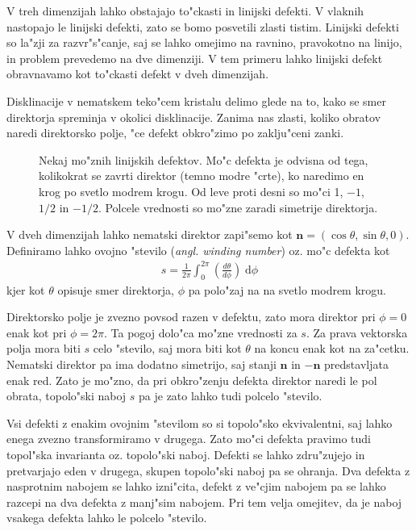 \documentclass[a4paper,10pt]{article}
\renewcommand{\vec}{\mathbf}
\newcommand{\angl}[1]{(\textit{angl. #1})}
\newcommand{\dd}{\ensuremath{\;\mathrm{d}}}
\begin{document}
V treh dimenzijah lahko obstajajo to"ckasti in linijski defekti\cite{degennes,kleman}. 
V vlaknih nastopajo le linijski defekti, zato se bomo posvetili zlasti tistim. 
Linijski defekti so la"zji za razvr"s"canje, saj se lahko omejimo na ravnino, pravokotno na linijo, in problem prevedemo na dve dimenziji. 
V tem primeru lahko linijski defekt obravnavamo kot to"ckasti defekt v dveh dimenzijah. 

Disklinacije v nematskem teko"cem kristalu delimo glede na to, kako se smer direktorja spreminja v okolici disklinacije. 
Zanima nas zlasti, koliko obratov naredi direktorsko polje, "ce defekt obkro"zimo po zaklju"ceni zanki. 

\begin{figure}[h]
 \centering
 \caption{Nekaj mo"znih linijskih defektov. Mo"c defekta je odvisna od tega, kolikokrat se zavrti direktor (temno modre "crte), ko naredimo en krog po svetlo modrem krogu. Od leve proti desni so mo"ci 1, $-1$, $1/2$ in $-1/2$. Polcele vrednosti so mo"zne zaradi simetrije direktorja. }
\end{figure}

V dveh dimenzijah lahko nematski direktor zapi"semo kot $\vec n = (\cos\theta, \sin\theta, 0)$. 
Definiramo lahko ovojno "stevilo \angl{winding number} oz. mo"c defekta kot
\begin{align}
\label{eq:winding-number}
 s = \frac{1}{2\pi}\int_0^{2\pi} \left(\frac{d\theta}{d\phi}\right) \dd \phi
\end{align}
kjer kot $\theta$ opisuje smer direktorja, $\phi$ pa polo"zaj na na svetlo modrem krogu. 

Direktorsko polje je zvezno povsod razen v defektu, zato mora direktor pri $\phi = 0$ enak kot pri $\phi = 2\pi$. 
Ta pogoj dolo"ca mo"zne vrednosti za $s$. 
Za prava vektorska polja mora biti $s$ celo "stevilo, saj mora biti kot $\theta$ na koncu enak kot na za"cetku. 
Nematski direktor pa ima dodatno simetrijo, saj stanji $\vec n$ in $-\vec n$ predstavljata enak red. 
Zato je mo"zno, da pri obkro"zenju defekta direktor naredi le pol obrata, topolo"ski naboj $s$ pa je zato lahko tudi polcelo "stevilo. 

Vsi defekti z enakim ovojnim "stevilom so si topolo"sko ekvivalentni, saj lahko enega zvezno transformiramo v drugega. 
Zato mo"ci defekta pravimo tudi topol"ska invarianta oz. topolo"ski naboj. 
Defekti se lahko zdru"zujejo in pretvarjajo eden v drugega, skupen topolo"ski naboj pa se ohranja. 
Dva defekta z nasprotnim nabojem se lahko izni"cita, defekt z ve"cjim nabojem pa se lahko razcepi na dva defekta z manj"sim nabojem. 
Pri tem velja omejitev, da je naboj vsakega defekta lahko le polcelo "stevilo. 
\end{document}
